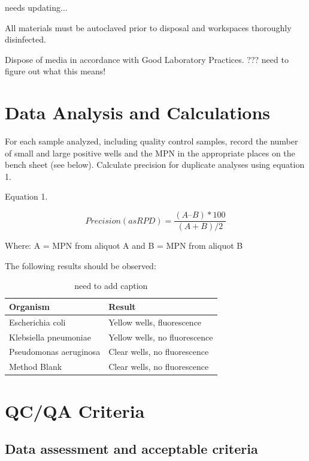 \documentclass[12pt]{../SOP4_alpha}\usepackage[]{graphicx}\usepackage[]{color}
\begin{document}
needs updating...

\NP All materials must be autoclaved prior to disposal and workspaces
thoroughly disinfected.

\NP Dispose of media in accordance with Good Laboratory Practices. ??? need to figure out what this means!

\section{Data Analysis and Calculations}

\NP For each sample analyzed, including quality control samples, record
the number of small and large positive wells and the MPN in the
appropriate places on the bench sheet (see below). Calculate
precision for duplicate analyses using equation 1.

\NP Equation 1. 

\begin{equation}
Precision (as RPD) = \frac{(A – B)*100}{(A + B)/2}
\end{equation}

Where: A = MPN from aliquot A and
 B = MPN from aliquot B 
 
 

\NP The following results should be observed:


\begin{table}
\caption{need to add caption}
		\begin{tabular}{ll}\hline

Organism                &  Result \\ \hline \hline
Escherichia coli        & Yellow wells, fluorescence \\
Klebsiella pneumoniae   & Yellow wells, no fluorescence \\
Pseudomonas aeruginosa  & Clear wells, no fluorescence \\
Method Blank            & Clear wells, no fluorescence \\ \hline
  \end{tabular}
\end{table}


\section{QC/QA Criteria}

\subsection{Data assessment and acceptable criteria}
\end{document}
